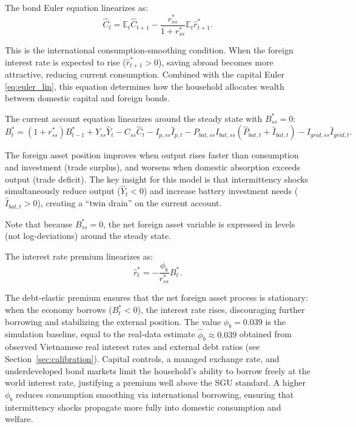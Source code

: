 	The bond Euler equation linearizes as:
	\begin{equation}
		\hat{C}_t = \mathbb{E}_t \hat{C}_{t+1} - \frac{r^*_{ss}}{1+r^*_{ss}} \mathbb{E}_t \hat{r}^*_{t+1}
		\label{eq:bond_euler_lin}.
	\end{equation}
	
	This is the international consumption-smoothing condition. When the foreign interest rate is expected to rise ($\hat{r}^*_{t+1} > 0$), saving abroad becomes more attractive, reducing current consumption. Combined with the capital Euler \eqref{eq:euler_lin}, this equation determines how the household allocates wealth between domestic capital and foreign bonds.
	
	The current account equation linearizes around the steady state with $B^*_{ss} = 0$:
	\begin{equation}
		B^*_t = (1 + r^*_{ss}) B^*_{t-1} + Y_{ss}\hat{Y}_t - C_{ss}\hat{C}_t - I_{p,ss}\hat{I}_{p,t} - P_{bat,ss}I_{bat,ss}(\hat{P}_{bat,t} + \hat{I}_{bat,t}) - I_{grid,ss}\hat{I}_{grid,t}
		\label{eq:ca_lin}.
	\end{equation}
	
	The foreign asset position improves when output rises faster than consumption and investment (trade surplus), and worsens when domestic absorption exceeds output (trade deficit). The key insight for this model is that intermittency shocks simultaneously reduce output ($\hat{Y}_t < 0$) and increase battery investment needs ($\hat{I}_{bat,t} > 0$), creating a ``twin drain'' on the current account.
	
	Note that because $B^*_{ss} = 0$, the net foreign asset variable is expressed in levels (not log-deviations) around the steady state.
	
	The interest rate premium linearizes as:
	\begin{equation}
		\hat{r}^*_t = -\frac{\phi_b}{r^*_{ss}} B^*_t
		\label{eq:premium_lin}.
	\end{equation}
	
	The debt-elastic premium ensures that the net foreign asset process is stationary: when the economy borrows ($B^*_t < 0$), the interest rate rises, discouraging further borrowing and stabilizing the external position. The value $\phi_b = 0.039$ is the simulation baseline, equal to the real-data estimate $\hat{\phi}_b \approx 0.039$ obtained from observed Vietnamese real interest rates and external debt ratios (see Section~\ref{sec:calibration}). Capital controls, a managed exchange rate, and underdeveloped bond markets limit the household's ability to borrow freely at the world interest rate, justifying a premium well above the SGU standard. A higher $\phi_b$ reduces consumption smoothing via international borrowing, ensuring that intermittency shocks propagate more fully into domestic consumption and welfare.
	
